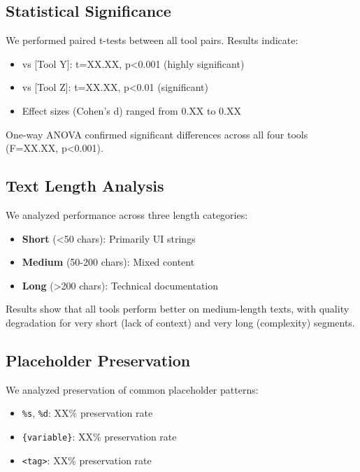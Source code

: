 \subsection{Statistical Significance}

We performed paired t-tests between all tool pairs. Results indicate:

\begin{itemize}
    \item [Tool X] vs [Tool Y]: t=XX.XX, p<0.001 (highly significant)
    \item [Tool X] vs [Tool Z]: t=XX.XX, p<0.01 (significant)
    \item Effect sizes (Cohen's d) ranged from 0.XX to 0.XX
\end{itemize}

One-way ANOVA confirmed significant differences across all four tools (F=XX.XX, p<0.001).

\subsection{Text Length Analysis}

We analyzed performance across three length categories:
\begin{itemize}
    \item \textbf{Short} (<50 chars): Primarily UI strings
    \item \textbf{Medium} (50-200 chars): Mixed content
    \item \textbf{Long} (>200 chars): Technical documentation
\end{itemize}

Results show that all tools perform better on medium-length texts, with quality degradation for very short (lack of context) and very long (complexity) segments.

\subsection{Placeholder Preservation}

We analyzed preservation of common placeholder patterns:
\begin{itemize}
    \item \texttt{\%s}, \texttt{\%d}: XX\% preservation rate
    \item \texttt{\{variable\}}: XX\% preservation rate
    \item \texttt{<tag>}: XX\% preservation rate
\end{itemize}


